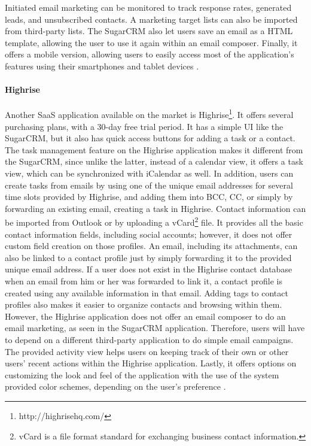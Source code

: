 Initiated email marketing can be monitored to track response rates, generated leads, and unsubscribed contacts. A marketing target lists can also be imported from third-party lists. The SugarCRM also let users save an email as a \ac{HTML} template, allowing the user to use it again within an email composer. Finally, it offers a mobile version, allowing users to easily access most of the application's features using their smartphones and tablet devices \citep{SugarCRMInc.2013}.

\paragraph{Highrise}
Another \ac{SaaS} application available on the market is Highrise\footnote{http://highrisehq.com/}. It offers several purchasing plans, with a 30-day free trial period. It has a simple \ac{UI} like the SugarCRM, but it also has quick access buttons for adding a task or a contact. The task management feature on the Highrise application makes it different from the SugarCRM, since unlike the latter, instead of a calendar view, it offers a task view, which can be synchronized with iCalendar as well. In addition, users can create tasks from emails by using one of the unique email addresses for several time slots provided by Highrise, and adding them into \ac{BCC}, \ac{CC}, or simply by forwarding an existing email, creating a task in Highrise. Contact information can be imported from Outlook or by uploading a vCard\footnote{vCard is a file format standard for exchanging business contact information.} file. It provides all the basic contact information fields, including social accounts; however, it does not offer custom field creation on those profiles. An email, including its attachments, can also be linked to a contact profile just by simply forwarding it to the provided unique email address. If a user does not exist in the Highrise contact database when an email from him or her was forwarded to link it, a contact profile is created using any available information in that email. Adding tags to contact profiles also makes it easier to organize contacts and browsing within them. However, the Highrise application does not offer an email composer to do an email marketing, as seen in the SugarCRM application. Therefore, users will have to depend on a different third-party application to do simple email campaigns. The provided activity view helps users on keeping track of their own or other users' recent actions within the Highrise application. Lastly, it offers options on customizing the look and feel of the application with the use of the system provided color schemes, depending on the user's preference \citep{37signals2013}.

